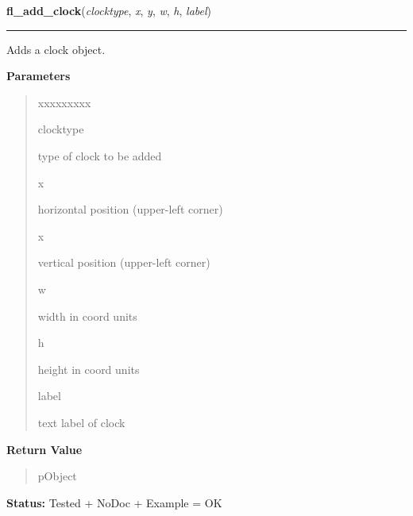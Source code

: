     \label{xformslib:library:fl_add_clock}

    \vspace{0.5ex}

\hspace{.8\funcindent}\begin{boxedminipage}{\funcwidth}

    \raggedright \textbf{fl\_add\_clock}(\textit{clocktype}, \textit{x}, \textit{y}, \textit{w}, \textit{h}, \textit{label})

    \vspace{-1.5ex}

    \rule{\textwidth}{0.5\fboxrule}
\setlength{\parskip}{2ex}
    Adds a clock object.

\setlength{\parskip}{1ex}
      \textbf{Parameters}
      \vspace{-1ex}

      \begin{quote}
        \begin{Ventry}{xxxxxxxxx}

          \item[clocktype]

          type of clock to be added

          \item[x]

          horizontal position (upper-left corner)

          \item[x]

          vertical position (upper-left corner)

          \item[w]

          width in coord units

          \item[h]

          height in coord units

          \item[label]

          text label of clock

        \end{Ventry}

      \end{quote}

      \textbf{Return Value}
    \vspace{-1ex}

      \begin{quote}
      pObject

      \end{quote}

\textbf{Status:} Tested + NoDoc + Example = OK



    \end{boxedminipage}

